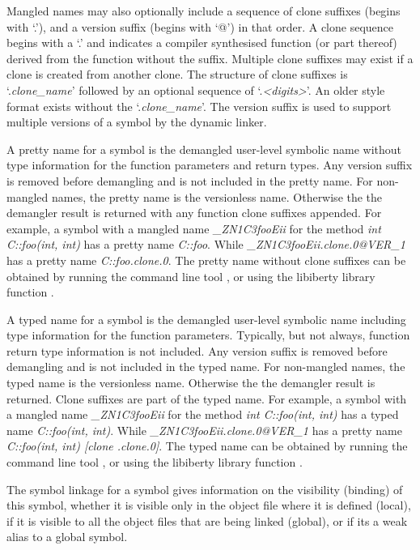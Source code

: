 \begin{description}
Mangled names may also optionally include a sequence of clone suffixes (begins with `.'), and a version suffix (begins with `@') in that order.
A clone sequence begins with a `.' and indicates a compiler synthesised function (or part thereof) derived from the function without the suffix.
Multiple clone suffixes may exist if a clone is created from another clone.
The structure of clone suffixes is `.\emph{clone\_name}' followed by an optional sequence of `.\emph{<digits>}'.
An older style format exists without the `.\emph{clone\_name}'.
The version suffix is used to support multiple versions of a symbol by the dynamic linker.
\item[Pretty Name] A pretty name for a symbol is the demangled user-level symbolic name without type information for the function parameters and return types.
Any version suffix is removed before demangling and is not included in the pretty name.
For non-mangled names, the pretty name is the versionless name.
Otherwise the the demangler result is returned with any function clone suffixes appended.
For example, a symbol with a mangled name \emph{\_ZN1C3fooEii} for the method \emph{int C::foo(int, int)} has a pretty name \emph{C::foo}.
While \emph{\_ZN1C3fooEii.clone.0@VER\_1} has a pretty name \emph{C::foo.clone.0}.
The pretty name without clone suffixes can be obtained by running the command line tool , or using the libiberty library function .
\item[Typed Name] A typed name for a symbol is the demangled user-level symbolic name including type information for the function parameters.
Typically, but not always, function return type information is not included.
Any version suffix is removed before demangling and is not included in the typed name.
For non-mangled names, the typed name is the versionless name.
Otherwise the the demangler result is returned.
Clone suffixes are part of the typed name.
For example, a symbol with a mangled name \emph{\_ZN1C3fooEii} for the method \emph{int C::foo(int, int)} has a typed name \emph{C::foo(int, int)}.
While \emph{\_ZN1C3fooEii.clone.0@VER\_1} has a pretty name \emph{C::foo(int, int) [clone .clone.0]}.
The typed name can be obtained by running the command line tool , or using the libiberty library function .
\item[Symbol Linkage] The symbol linkage for a symbol gives information on the visibility (binding) of this symbol, whether it is visible only in the object file where it is defined (local), if it is visible to all the object files that are being linked (global), or if its a weak alias to a global symbol.

\end{description}
